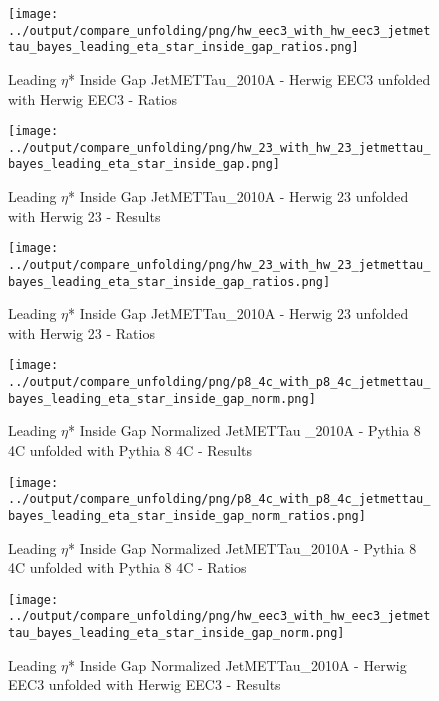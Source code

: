 \documentclass[11pt]{book}
\begin{document}
\begin{figure}[ht]
\centering
\texttt{[image: ../output/compare\_unfolding/png/hw\_eec3\_with\_hw\_eec3\_jetmettau\_bayes\_leading\_eta\_star\_inside\_gap\_ratios.png]}
\caption{Leading $\eta$* Inside Gap JetMETTau\_2010A - Herwig EEC3 unfolded with Herwig EEC3 - Ratios}
\label{hw_eec3_hw_eec3_jetmettau_bayes_leading_eta_star_inside_gap_b}
\end{figure}

\begin{figure}[ht]
\centering
\texttt{[image: ../output/compare\_unfolding/png/hw\_23\_with\_hw\_23\_jetmettau\_bayes\_leading\_eta\_star\_inside\_gap.png]}
\caption{Leading $\eta$* Inside Gap JetMETTau\_2010A - Herwig 23 unfolded with Herwig 23 - Results}
\label{hw_23_hw_23_jetmettau_bayes_leading_eta_star_inside_gap_a}
\end{figure}

\begin{figure}[ht]
\centering
\texttt{[image: ../output/compare\_unfolding/png/hw\_23\_with\_hw\_23\_jetmettau\_bayes\_leading\_eta\_star\_inside\_gap\_ratios.png]}
\caption{Leading $\eta$* Inside Gap JetMETTau\_2010A - Herwig 23 unfolded with Herwig 23 - Ratios}
\label{hw_23_hw_23_jetmettau_bayes_leading_eta_star_inside_gap_b}
\end{figure}


\begin{figure}[ht]
\centering
\texttt{[image: ../output/compare\_unfolding/png/p8\_4c\_with\_p8\_4c\_jetmettau\_bayes\_leading\_eta\_star\_inside\_gap\_norm.png]}
\caption{Leading $\eta$* Inside Gap Normalized JetMETTau \_2010A - Pythia 8 4C unfolded with Pythia 8 4C - Results}
\label{p8_p8_jetmettau_bayes_leading_eta_star_inside_gap_norm_a}
\end{figure}

\begin{figure}[ht]
\centering
\texttt{[image: ../output/compare\_unfolding/png/p8\_4c\_with\_p8\_4c\_jetmettau\_bayes\_leading\_eta\_star\_inside\_gap\_norm\_ratios.png]}
\caption{Leading $\eta$* Inside Gap Normalized JetMETTau\_2010A - Pythia 8 4C unfolded with Pythia 8 4C - Ratios}
\label{p8_p8_jetmettau_bayes_leading_eta_star_inside_gap_norm_b}
\end{figure}

\begin{figure}[ht]
\centering
\texttt{[image: ../output/compare\_unfolding/png/hw\_eec3\_with\_hw\_eec3\_jetmettau\_bayes\_leading\_eta\_star\_inside\_gap\_norm.png]}
\caption{Leading $\eta$* Inside Gap Normalized JetMETTau\_2010A - Herwig EEC3 unfolded with Herwig EEC3 - Results}
\label{hw_eec3_hw_eec3_jetmettau_bayes_leading_eta_star_inside_gap_norm_a}
\end{figure}
\end{document}
